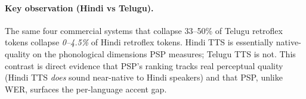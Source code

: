 \documentclass[conference,a4paper]{IEEEtran}
\newcommand{\psp}{\textsc{PSP}}
\begin{document}
\begin{table}[t]
\centering
\caption{\emph{Preliminary} \psp{} on Hindi pilot set ($n = 20$ wavs per system; 22 retroflex and 18 aspirated tokens in aggregate per system). All four systems are near-native on both dimensions.}
\label{tab:hindi_preliminary}
\small
{}
\end{table}

\paragraph{Key observation (Hindi vs Telugu).} The same four commercial systems that collapse 33--50\% of Telugu retroflex tokens collapse \emph{0--4.5\%} of Hindi retroflex tokens. Hindi TTS is essentially native-quality on the phonological dimensions PSP measures; Telugu TTS is not. This contrast is direct evidence that PSP's ranking tracks real perceptual quality (Hindi TTS \emph{does} sound near-native to Hindi speakers) and that PSP, unlike WER, surfaces the per-language accent gap.

\begin{table}[t]
\centering
\caption{\emph{Preliminary} Fr\'echet Audio Distance on the Hindi pilot set ($n = 20$ wavs per system, $n_{\text{ref}} = 1000$ native utterances). Lower is closer to native distribution.}
\label{tab:hindi_fad}
\small
{}
\end{table}
\end{document}
